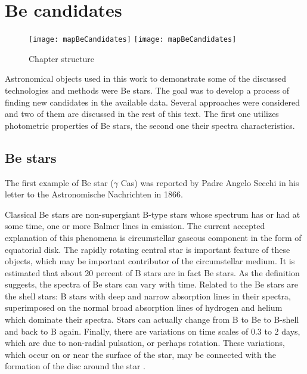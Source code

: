 \chapter{Be candidates}



\begin{figure}[!htbp]
  \begin{center}
    \leavevmode
    \ifpdf
    \texttt{[image: mapBeCandidates]}
    \else
    \texttt{[image: mapBeCandidates]} 
    \fi
    \caption{Chapter structure}
    \label{FigStructure}
  \end{center}
\end{figure}


\noindent Astronomical objects used in this work to demonstrate some
of the discussed technologies and methods were Be stars. The goal was
to develop a process of finding new candidates in the available
data. Several approaches were considered and two of them are discussed
in the rest of this text. The first one utilizes photometric
properties of Be stars, the second one their spectra characteristics.


\section{Be stars}
\label{sec:be}
The first example of Be star ($\gamma$ Cas) was reported by Padre Angelo
Secchi in his letter to the Astronomische Nachrichten in 1866.

Classical Be stars are non-supergiant B-type stars whose spectrum has
or had at some time, one or more Balmer lines in emission. The current
accepted explanation of this phenomena is circumstellar gaseous
component in the form of equatorial disk. The rapidly rotating central
star is important feature of these objects, which may be important
contributor of the circumstellar medium. It is estimated that about 20
percent of B stars are in fact Be stars. As the definition suggests,
the spectra of Be stars can vary with time. Related to the Be stars
are the shell stars: B stars with deep and narrow absorption lines in
their spectra, superimposed on the normal broad absorption lines of
hydrogen and helium which dominate their spectra. Stars can actually
change from B to Be to B-shell and back to B again. Finally, there are
variations on time scales of 0.3 to 2 days, which are due to
non-radial pulsation, or perhaps rotation. These variations, which
occur on or near the surface of the star, may be connected with the
formation of the disc around the star \citep{porter2003classical}.

